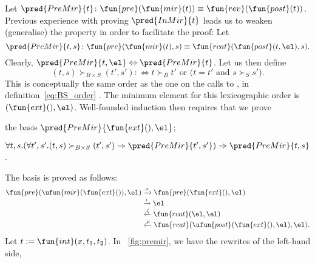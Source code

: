Let \(\pred{PreMir}{t} \colon \fun{pre}(\fun{mir}(t)) \equiv
\fun{rev}(\fun{post}(t))\). Previous
experience with proving \(\pred{InMir}{t}\) leads us to weaken
(generalise) the property in order to facilitate the proof: Let
\begin{equation*}
  \pred{PreMir}{t,s} \colon \fun{pre}(\fun{mir}(t),s) \equiv
  \fun{rcat}(\fun{post}(t,\el),s).
  \index{rcat@\fun{rcat/2}}
\end{equation*}
Clearly, \(\pred{PreMir}{t,\el} \Leftrightarrow
\pred{PreMir}{t}\). Let us then define
\begin{equation*}
  (t,s) \succ_{B \times S} (t',s') :\Leftrightarrow \text{\(t \succ_{B}
    t'\) or (\(t = t'\) and \(s \succ_{S} s'\))}.
\end{equation*}
This is conceptually the same order as the one on the calls to
, in definition~\eqref{eq:BS_order}
. The minimum element for this lexicographic
order is \((\fun{ext}(),\el)\). Well\hyp{}founded induction then
requires that we prove
\begin{itemize*}

  \item the basis \(\pred{PreMir}{\fun{ext}(),\el}\);

  \item \(\forall t,s. (\forall t',s'.(t,s) \succ_{B \times S} (t',s')
    \Rightarrow \pred{PreMir}{t',s'}) \Rightarrow
    \pred{PreMir}{t,s}\).

\end{itemize*}
The basis is proved as follows:
\begin{align*}
  \fun{pre}(\ufun{mir}(\fun{ext}()),\el)
  &\xrightarrow{\smash{\sigma}} \fun{pre}(\fun{ext}(),\el)\\
  &\xrightarrow{\smash{\iota}} \el\\
  &\xleftarrow{\smash{\zeta}} \fun{rcat}(\el,\el)\\
  &\xleftarrow{\smash{\mu}}
  \fun{rcat}(\ufun{post}(\fun{ext}(),\el),\el).
\end{align*}
Let \(t := \fun{int}(x,t_1,t_2)\). In \fig~\vref{fig:premir}, we have
the rewrites of the left\hyp{}hand side,
